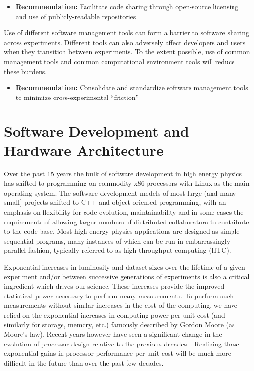 \begin{itemize}
\item[] {\bf Recommendation:} 
Facilitate code sharing through open-source licensing and use of publicly-readable repositories
\end{itemize}

Use of different software management tools can form a barrier to software sharing across experiments.
Different tools can also adversely affect developers and users when they
transition between experiments.
To the extent possible, use of common management tools
and common computational environment tools will reduce these burdens.

\begin{itemize}
\item[] {\bf Recommendation:} 
Consolidate and standardize software management tools to minimize cross-experimental ``friction''
\end{itemize}



\section{Software Development and Hardware Architecture}
\label{CpFI4:sec:development}

Over the past 15 years the bulk of software development in high energy physics
has shifted to programming on commodity x86 processors with Linux as the
main operating
system. The software development models of most large (and many small) projects
shifted to C++ and object oriented programming, with an emphasis on flexibility
for code evolution, maintainability and in some cases the requirements of allowing larger
numbers of distributed collaborators to contribute to the code base. Most high
energy physics applications are designed as simple sequential programs,
many instances of which can be run in embarrassingly parallel fashion, typically
referred to as high throughput computing (HTC). 

Exponential increases in luminosity and dataset sizes over the lifetime of a
given experiment and/or between successive generations of experiments
is also a critical ingredient which drives our science. These increases provide
the improved statistical power necessary to perform many measurements.
To perform such measurements without similar increases in the cost of
the computing, we have relied on the exponential increases in computing
power per unit cost (and similarly for storage, memory, etc.) famously
described by Gordon Moore (as Moore's law). Recent years however have seen a
significant change in the evolution of processor design relative to the
previous decades~\cite{GAMEOVER}. Realizing these exponential gains
in processor performance per unit cost will be much more difficult in
the future than over the past few decades.

